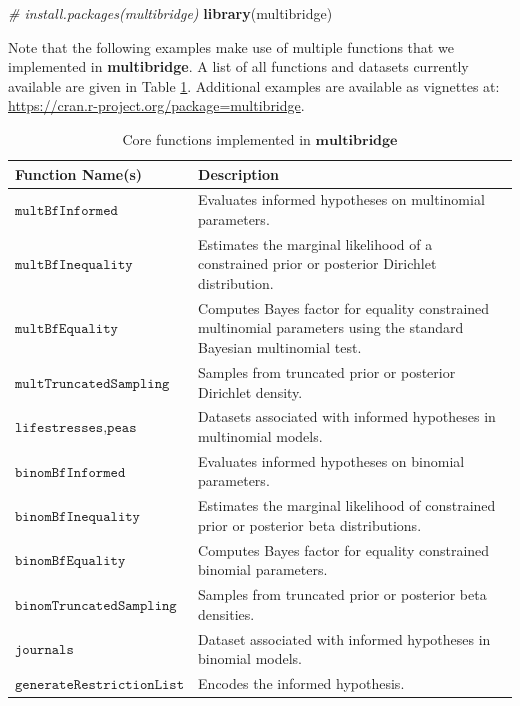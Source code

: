 \documentclass[
  english,
  man,floatsintext]{apa6}
\newenvironment{Shaded}{\begin{snugshade}}{\end{snugshade}}
\newcommand{\CommentTok}[1]{\textcolor[rgb]{0.56,0.35,0.01}{\textit{#1}}}
\newcommand{\KeywordTok}[1]{\textcolor[rgb]{0.13,0.29,0.53}{\textbf{#1}}}
\newcommand{\NormalTok}[1]{#1}
\newcommand{\StringTok}[1]{\textcolor[rgb]{0.31,0.60,0.02}{#1}}
\begin{document}
\begin{Shaded}
\begin{Highlighting}[]
\CommentTok{\# install.packages(\textquotesingle{}multibridge\textquotesingle{})}
\KeywordTok{library}\NormalTok{(}\StringTok{\textquotesingle{}multibridge\textquotesingle{}}\NormalTok{)}
\end{Highlighting}
\end{Shaded}

Note that the following examples make use of multiple functions that we implemented in \textbf{multibridge}. A list of all functions and datasets currently available are given in Table \ref{table:core_functions}. Additional examples are available as vignettes at: \url{https://cran.r-project.org/package=multibridge}.

\begin{table}
\caption {Core functions implemented in $\textbf{multibridge}$}
\label{table:core_functions}
\begin{center}
\begin{tabular}{p{5cm}p{11cm}}
        \toprule
Function Name(s) & Description \\\midrule
$\texttt{multBfInformed}$ & Evaluates informed hypotheses on multinomial parameters.  \\
$\texttt{multBfInequality}$ & Estimates the marginal likelihood of a constrained prior or posterior Dirichlet distribution.  \\
$\texttt{multBfEquality}$ & Computes Bayes factor for equality constrained multinomial parameters using the standard Bayesian multinomial test.  \\
$\texttt{multTruncatedSampling}$ & Samples from truncated prior or posterior Dirichlet density.\\
$ \texttt{lifestresses}, \texttt{peas}$ & Datasets associated with informed hypotheses in multinomial models.\\\midrule
$\texttt{binomBfInformed}$ & Evaluates informed hypotheses on binomial parameters.  \\
$\texttt{binomBfInequality}$ & Estimates the marginal likelihood of constrained prior or posterior beta distributions.\\
$\texttt{binomBfEquality}$ & Computes Bayes factor for equality constrained binomial parameters.  \\
$\texttt{binomTruncatedSampling}$ & Samples from truncated prior or posterior beta densities.\\
$ \texttt{journals}$ & Dataset associated with informed hypotheses in binomial models.\\\midrule
$ \texttt{generateRestrictionList}$ & Encodes the informed hypothesis.\\
\bottomrule
\end{tabular}
\end{center}
\end{table}
\end{document}
